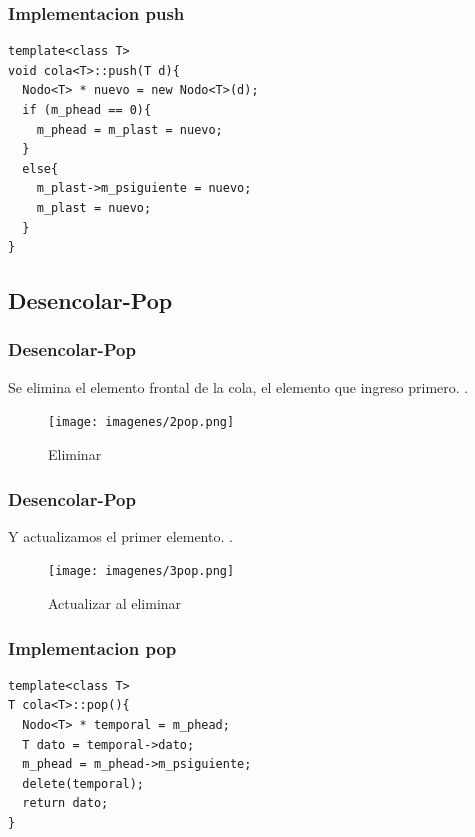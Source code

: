\documentclass{beamer}
\begin{document}
\begin{frame}[fragile]
\frametitle{Implementacion push}
\begin{verbatim}
template<class T>
void cola<T>::push(T d){
  Nodo<T> * nuevo = new Nodo<T>(d);
  if (m_phead == 0){
    m_phead = m_plast = nuevo;
  }
  else{
    m_plast->m_psiguiente = nuevo;
    m_plast = nuevo;
  }
}
\end{verbatim}
\end{frame}



    
\subsection{Desencolar-Pop}
    \begin{frame}
      \frametitle{Desencolar-Pop}
      Se elimina el elemento frontal de la cola, el elemento que ingreso primero. 
      .\\
      
      \begin{figure}
  \texttt{[image: imagenes/2pop.png]}
      \caption{Eliminar}
      \end{figure}
      
    \end{frame}
    \begin{frame}
      \frametitle{Desencolar-Pop}
      Y actualizamos el primer elemento.
      .\\
      \begin{figure}
  \texttt{[image: imagenes/3pop.png]}
  \caption{Actualizar al eliminar}
      \end{figure}
    \end{frame}

\begin{frame}[fragile]
\frametitle{Implementacion pop}
\begin{verbatim}
template<class T>
T cola<T>::pop(){
  Nodo<T> * temporal = m_phead;
  T dato = temporal->dato;
  m_phead = m_phead->m_psiguiente;
  delete(temporal);
  return dato;
}
\end{verbatim}
\end{frame}


    
\end{document}

